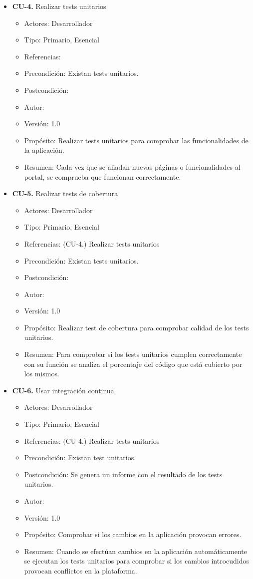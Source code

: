 \begin{itemize}
  \item \textbf{CU-4.} Realizar tests unitarios
  \begin{itemize}
    \item Actores: Desarrollador
    \item Tipo: Primario, Esencial
    \item Referencias:
    \item Precondición: Existan tests unitarios.
    \item Postcondición: 
    \item Autor: \autor
    \item Versión: 1.0
    \item Propósito: Realizar tests unitarios para comprobar las funcionalidades de la aplicación.
    \item Resumen: Cada vez que se añadan nuevas páginas o funcionalidades al portal, se comprueba que funcionan correctamente.
  \end{itemize}
 
  \item \textbf{CU-5.} Realizar tests de cobertura
  \begin{itemize}
    \item Actores: Desarrollador
    \item Tipo: Primario, Esencial
    \item Referencias: (CU-4.) Realizar tests unitarios
    \item Precondición: Existan tests unitarios.
    \item Postcondición: 
    \item Autor: \autor
    \item Versión: 1.0
    \item Propósito: Realizar test de cobertura para comprobar calidad de los tests unitarios.
    \item Resumen: Para comprobar si los tests unitarios cumplen correctamente con su función se analiza el porcentaje del
    código que está cubierto por los mismos.
  \end{itemize}
 
  \newpage
  \item \textbf{CU-6.} Usar integración continua
  \begin{itemize}
    \item Actores: Desarrollador
    \item Tipo: Primario, Esencial
    \item Referencias: (CU-4.) Realizar tests unitarios
    \item Precondición: Existan test unitarios.
    \item Postcondición: Se genera un informe con el resultado de los tests unitarios.
    \item Autor: \autor
    \item Versión: 1.0
    \item Propósito: Comprobar si los cambios en la aplicación provocan errores.
    \item Resumen: Cuando se efectúan cambios en la aplicación automáticamente se ejecutan los tests unitarios para comprobar si
    los cambios introcudidos provocan conflictos en la plataforma.
  \end{itemize}
 

\end{itemize}
